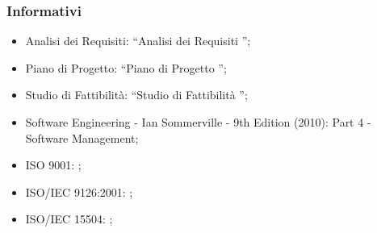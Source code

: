 		\subsubsection{Informativi}
			\begin{itemize}
				\item Analisi dei Requisiti: “Analisi dei Requisiti \lastversion”;
				\item Piano di Progetto: “Piano di Progetto \lastversion”;
				\item Studio di Fattibilità: “Studio di Fattibilità \lastversion”;
				\item Software Engineering - Ian Sommerville - 9th Edition (2010): Part 4 - Software Management;
				\item ISO 9001: ;
				\item ISO/IEC 9126:2001: ;
				\item ISO/IEC 15504: ;
			\end{itemize}
